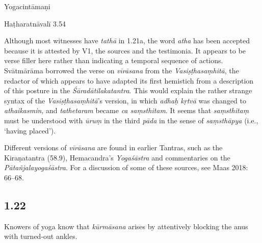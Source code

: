 \begin{ekdosis}
\begin{testimonia}[hp01_021]
Yogacintāmaṇi

\begin{versinnote}
\end{versinnote}

Haṭharatnāvalī 3.54

\begin{versinnote}
\end{versinnote}

\end{testimonia}

\begin{philcomm}[hp01_021]   
Although most witnesses have \emph{tathā} in 1.21a, the word \emph{atha} has been accepted because it is attested by V1, the sources and the testimonia. It appears to be verse filler here rather than indicating a temporal sequence of actions. Svātmārāma borrowed the verse on \emph{vīrāsana} from the \emph{Vasiṣṭhasaṃhitā}, the redactor of which appears to have adapted its first hemistich from a description of this posture in the \emph{Śāradātilakatantra}. This would explain the rather strange syntax of the \emph{Vasiṣṭhasaṃhitā}’s version, in which \emph{adhaḥ kṛtvā} was changed to \emph{athaikasmin}, and \emph{tathetaram} became \emph{ca saṃsthitam}. It seems that \emph{saṃsthitaṃ} must be understood with \emph{ūruṃ} in the third \emph{pāda} in the sense of \emph{saṃsthāpya} (i.e., ‘having placed’).

Different versions of \emph{vīrāsana} are found in earlier Tantras, such as the Kiraṇatantra (58.9), Hemacandra’s \emph{Yogaśāstra} and commentaries on the \emph{Pātañjalayogaśāstra}. For a discussion of some of these sources, see Maas 2018: 66–68.
\end{philcomm}

\subsection*{1.22}
\begin{translation}[hp01_022]
Knowers of yoga know that \emph{kūrmāsana} arises by attentively blocking the anus with turned-out ankles.
\end{translation}


\end{ekdosis}
